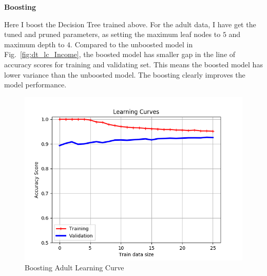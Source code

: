 \documentclass[         %
aps,                    %
prl,                    %
showpacs,               %
superscriptaddress,    %
nofootinbib,            %
twocolumn,             %
showkeys,               %
preprintnumbers,        %
floatfix               %
]{revtex4-1}               %
\begin{document}

{\bf Boosting}\label{boost}

Here I boost the Decision Tree trained above. For the adult data, I have get the tuned and pruned parameters, as setting the maximum leaf nodes to $5$ and maximum depth to $4$.
Compared to the unboosted model in Fig.~\ref{fig:dt_lc_Income}, the boosted model has smaller gap in the line of accuracy scores for training and validating set.
This means the boosted model has lower variance than the unboosted model. The boosting clearly improves the model performance.
\begin{figure}[h!]
  \centering \includegraphics[width=\linewidth]{../boosting_adult_LearningCurve}
  \caption{Boosting Adult Learning Curve\label{fig:svmrbf_lc_adult}}
\end{figure}
\end{document}
